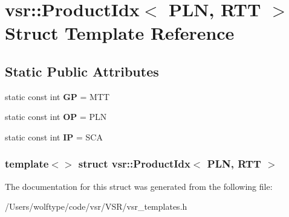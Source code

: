 \hypertarget{structvsr_1_1_product_idx_3_01_p_l_n_00_01_r_t_t_01_4}{\section{vsr\-:\-:Product\-Idx$<$ P\-L\-N, R\-T\-T $>$ Struct Template Reference}
\label{structvsr_1_1_product_idx_3_01_p_l_n_00_01_r_t_t_01_4}
}
\subsection*{Static Public Attributes}
\begin{DoxyCompactItemize}
\item 
\hypertarget{structvsr_1_1_product_idx_3_01_p_l_n_00_01_r_t_t_01_4_ab14397165054367b21e1da512c9dcdfe}{static const int {\bfseries G\-P} = M\-T\-T}\label{structvsr_1_1_product_idx_3_01_p_l_n_00_01_r_t_t_01_4_ab14397165054367b21e1da512c9dcdfe}

\item 
\hypertarget{structvsr_1_1_product_idx_3_01_p_l_n_00_01_r_t_t_01_4_aa76a20c7843530b3332d550c57e93bd9}{static const int {\bfseries O\-P} = P\-L\-N}\label{structvsr_1_1_product_idx_3_01_p_l_n_00_01_r_t_t_01_4_aa76a20c7843530b3332d550c57e93bd9}

\item 
\hypertarget{structvsr_1_1_product_idx_3_01_p_l_n_00_01_r_t_t_01_4_a36c990b48a5fd02cfc3416e98ca43977}{static const int {\bfseries I\-P} = S\-C\-A}\label{structvsr_1_1_product_idx_3_01_p_l_n_00_01_r_t_t_01_4_a36c990b48a5fd02cfc3416e98ca43977}

\end{DoxyCompactItemize}
\subsubsection*{template$<$$>$ struct vsr\-::\-Product\-Idx$<$ P\-L\-N, R\-T\-T $>$}



The documentation for this struct was generated from the following file\-:\begin{DoxyCompactItemize}
\item 
/\-Users/wolftype/code/vsr/\-V\-S\-R/vsr\-\_\-templates.\-h\end{DoxyCompactItemize}
